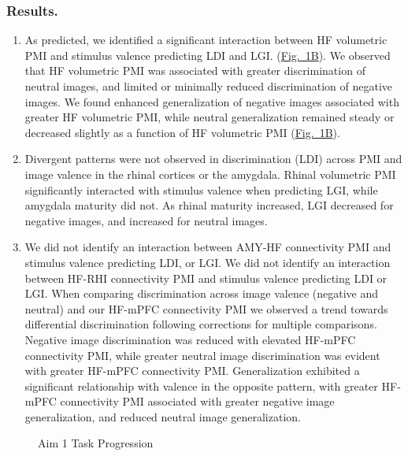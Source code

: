 \documentclass[11pt]{article}
\begin{document}
\subsubsection*{Results.}
\begin{enumerate}
    \item As predicted, we identified a significant interaction between HF volumetric
          PMI and stimulus valence predicting LDI and LGI\@.
          (\hyperref[fig:1]{Fig.\ 1B}). We observed that HF volumetric PMI was
          associated with greater discrimination of neutral images, and limited or
          minimally reduced discrimination of negative images. We found enhanced
          generalization of negative images associated with greater HF volumetric PMI,
          while neutral generalization remained steady or decreased slightly as a
          function of HF volumetric PMI (\hyperref[fig:1]{Fig.\ 1B}).
    \item Divergent patterns were not observed in discrimination (LDI) across PMI and
          image valence in the rhinal cortices or the amygdala. Rhinal volumetric PMI
          significantly interacted with stimulus valence when predicting LGI, while
          amygdala maturity did not. As rhinal maturity increased, LGI decreased for
          negative images, and increased for neutral images.
    \item We did not identify an interaction between AMY-HF connectivity PMI and
          stimulus valence predicting LDI, or LGI\@. We did not identify an interaction
          between HF-RHI connectivity PMI and stimulus valence predicting LDI or LGI\@.
          When comparing discrimination across image valence (negative and neutral) and
          our HF-mPFC connectivity PMI we observed a trend towards differential
          discrimination following corrections for multiple comparisons. Negative image
          discrimination was reduced with elevated HF-mPFC connectivity PMI, while
          greater neutral image discrimination was evident with greater HF-mPFC
          connectivity PMI\@. Generalization exhibited a significant relationship with
          valence in the opposite pattern, with greater HF-mPFC connectivity PMI
          associated with greater negative image generalization, and reduced neutral
          image generalization.
\end{enumerate}
\begin{figure}%
    \centering
    \qquad
    \caption{Aim 1 Task Progression}%
    \label{fig:1}%
\end{figure}
\end{document}
